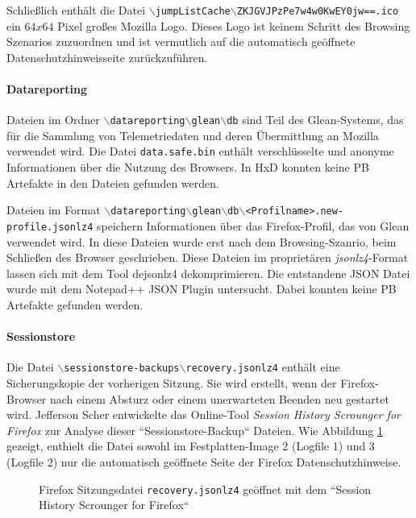 \begin{appendices}
		Schließlich enthält die Datei \texttt{$\backslash$jumpListCache$\backslash$ZKJGVJPzPe7w4w0KwEY0jw==.ico} ein $64x64$ Pixel großes Mozilla Logo. Dieses Logo ist keinem Schritt des Browsing Szenarios zuzuordnen und ist vermutlich auf die automatisch geöffnete Datenschutzhinweisseite zurückzuführen.
		
		\paragraph*{Datareporting}
		Dateien im Ordner \texttt{$\backslash$datareporting$\backslash$glean$\backslash$db} sind Teil des Glean-Systems, das für die Sammlung von Telemetriedaten und deren Übermittlung an Mozilla verwendet wird. \cite{GitHub.05.06.2023}
		Die Datei \texttt{data.safe.bin} enthält verschlüsselte und anonyme Informationen über die Nutzung des Browsers. In HxD konnten keine PB Artefakte in den Dateien gefunden werden. 
		
		Dateien im Format \texttt{$\backslash$datareporting$\backslash$glean$\backslash$db$\backslash$<Profilname>.new-profile.jsonlz4} speichern Informationen über das Firefox-Profil, das von Glean verwendet wird. In diese Dateien wurde erst nach dem Browsing-Szanrio, beim Schließen des Browser geschrieben. Diese Dateien im proprietären \textit{jsonlz4}-Format lassen sich mit dem Tool dejsonlz4 dekomprimieren. Die entstandene JSON Datei wurde mit dem Notepad++ JSON Plugin untersucht. Dabei konnten keine PB Artefakte gefunden werden.
		
		\paragraph*{Sessionstore}
		Die Datei \texttt{$\backslash$sessionstore-backups$\backslash$recovery.jsonlz4} enthält eine Sicherungskopie der vorherigen Sitzung. Sie wird erstellt, wenn der Firefox-Browser nach einem Absturz oder einem unerwarteten Beenden neu gestartet wird. 
		Jefferson Scher entwickelte das Online-Tool \textit{Session History Scrounger for Firefox} zur Analyse dieser ``Sessionstore-Backup`` Dateien. \cite{JeffersonScher.29.11.2020}
		Wie Abbildung \ref{img:firefox-session-history-scrounger} gezeigt, enthielt die Datei sowohl im Festplatten-Image 2 (Logfile 1) und 3 (Logfile 2) nur die automatisch geöffnete Seite der Firefox Datenschutzhinweise.
		\begin{figure}[h!]
			\caption{Firefox Sitzungsdatei \texttt{recovery.jsonlz4} geöffnet mit dem ``Session History Scrounger for Firefox``}
			\label{img:firefox-session-history-scrounger}
		\end{figure}
		

\end{appendices}
